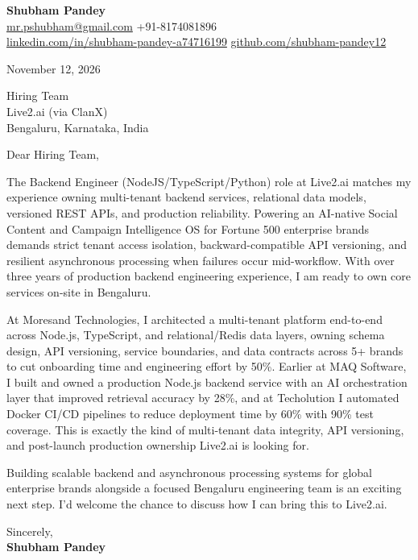 \documentclass[a4paper,11pt]{article}
\begin{document}
\textbf{\Large Shubham Pandey}\\
\href{mailto:mr.pshubham@gmail.com}{mr.pshubham@gmail.com} \quad +91-8174081896\\
\href{https://www.linkedin.com/in/shubham-pandey-a74716199/}{linkedin.com/in/shubham-pandey-a74716199} \quad
\href{https://github.com/shubham-pandey12}{github.com/shubham-pandey12}

\vspace{1em}
November 12, 2026

\vspace{1em}
Hiring Team\\
Live2.ai (via ClanX)\\
Bengaluru, Karnataka, India

\vspace{1em}
Dear Hiring Team,

The Backend Engineer (NodeJS/TypeScript/Python) role at Live2.ai matches my experience owning multi-tenant backend services, relational data models, versioned REST APIs, and production reliability. Powering an AI-native Social Content and Campaign Intelligence OS for Fortune 500 enterprise brands demands strict tenant access isolation, backward-compatible API versioning, and resilient asynchronous processing when failures occur mid-workflow. With over three years of production backend engineering experience, I am ready to own core services on-site in Bengaluru.

At Moresand Technologies, I architected a multi-tenant platform end-to-end across Node.js, TypeScript, and relational/Redis data layers, owning schema design, API versioning, service boundaries, and data contracts across 5+ brands to cut onboarding time and engineering effort by 50\%. Earlier at MAQ Software, I built and owned a production Node.js backend service with an AI orchestration layer that improved retrieval accuracy by 28\%, and at Techolution I automated Docker CI/CD pipelines to reduce deployment time by 60\% with 90\% test coverage. This is exactly the kind of multi-tenant data integrity, API versioning, and post-launch production ownership Live2.ai is looking for.

Building scalable backend and asynchronous processing systems for global enterprise brands alongside a focused Bengaluru engineering team is an exciting next step. I'd welcome the chance to discuss how I can bring this to Live2.ai.

\vspace{1em}
Sincerely,\\[0.5em]
\textbf{Shubham Pandey}
\end{document}
